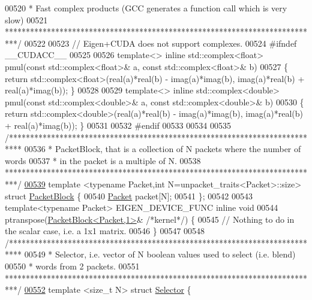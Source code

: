 \begin{DoxyCode}
{00520 \textcolor{comment}{* Fast complex products (GCC generates a function call which is very slow)}
00521 \textcolor{comment}{***************************************************************************/}
00522 
00523 \textcolor{comment}{// Eigen+CUDA does not support complexes.}
00524 \textcolor{preprocessor}{#ifndef \_\_CUDACC\_\_}
00525 
00526 \textcolor{keyword}{template}<> \textcolor{keyword}{inline} std::complex<float> pmul(\textcolor{keyword}{const} std::complex<float>& a, \textcolor{keyword}{const} std::complex<float>& b)
00527 \{ \textcolor{keywordflow}{return} std::complex<float>(real(a)*real(b) - imag(a)*imag(b), imag(a)*real(b) + real(a)*imag(b)); \}
00528 
00529 \textcolor{keyword}{template}<> \textcolor{keyword}{inline} std::complex<double> pmul(\textcolor{keyword}{const} std::complex<double>& a, \textcolor{keyword}{const} std::complex<double>& b)
00530 \{ \textcolor{keywordflow}{return} std::complex<double>(real(a)*real(b) - imag(a)*imag(b), imag(a)*real(b) + real(a)*imag(b)); \}
00531 
00532 \textcolor{preprocessor}{#endif}
00533 
00534 
00535 \textcolor{comment}{/***************************************************************************}
00536 \textcolor{comment}{ * PacketBlock, that is a collection of N packets where the number of words}
00537 \textcolor{comment}{ * in the packet is a multiple of N.}
00538 \textcolor{comment}{***************************************************************************/}
\hyperlink{struct_eigen_1_1internal_1_1_packet_block}{00539} template <typename Packet,int N=unpacket\_traits<Packet>::size> \textcolor{keyword}{struct }
      \hyperlink{struct_eigen_1_1internal_1_1_packet_block}{PacketBlock} \{
00540   \hyperlink{union_eigen_1_1internal_1_1_packet}{Packet} packet[N];
00541 \};
00542 
00543 \textcolor{keyword}{template}<\textcolor{keyword}{typename} Packet> EIGEN\_DEVICE\_FUNC \textcolor{keyword}{inline} \textcolor{keywordtype}{void}
00544 ptranspose(\hyperlink{struct_eigen_1_1internal_1_1_packet_block}{PacketBlock<Packet,1>}& \textcolor{comment}{/*kernel*/}) \{
00545   \textcolor{comment}{// Nothing to do in the scalar case, i.e. a 1x1 matrix.}
00546 \}
00547 
00548 \textcolor{comment}{/***************************************************************************}
00549 \textcolor{comment}{ * Selector, i.e. vector of N boolean values used to select (i.e. blend)}
00550 \textcolor{comment}{ * words from 2 packets.}
00551 \textcolor{comment}{***************************************************************************/}
\hyperlink{struct_eigen_1_1internal_1_1_selector}{00552} \textcolor{keyword}{template} <\textcolor{keywordtype}{size\_t} N> \textcolor{keyword}{struct }\hyperlink{struct_eigen_1_1internal_1_1_selector}{Selector} \{
}
\end{DoxyCode}
